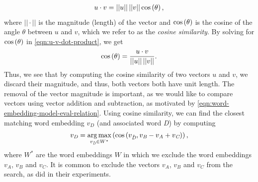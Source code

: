 \begin{align}
    u \cdot v = ||u||\,||v|| \cos\left(\theta\right),
    \label{eqn:u-v-dot-product}
\end{align}
where $||\cdot||$ is the magnitude (length) of the vector and $\cos \left(\theta\right)$ is the cosine of the angle $\theta$ between $u$ and $v$, which we refer to as the \textit{cosine similarity}. By solving for $\cos \left(\theta\right)$ in \cref{eqn:u-v-dot-product}, we get
\begin{align}
    \cos\left(\theta\right) = \frac{u \cdot v}{||u||\,||v||}.
    \label{eqn:cosine-similarity}
\end{align}
Thus, we see that by computing the cosine similarity of two vectors $u$ and $v$, we discard their magnitude, and thus, both vectors both have unit length. The removal of the vector magnitude is important, as we would like to compare vectors using vector addition and subtraction, as motivated by \cref{eqn:word-embedding-model-eval-relation}. Using cosine similarity, we can find the closest matching word embedding $v_{\textit{D}}$ (and associated word \textit{D}) by computing
\begin{align}
    v_{\textit{D}} = \operatorname*{arg\,max}_{v_{\Tilde{\textit{D}}} \in W^*} \left(\cos \left(v_{\Tilde{\textit{D}}}, v_{\textit{B}} - v_{\textit{A}} + v_{\textit{C}}\right)\right),
\end{align}
where $W^*$ are the word embeddings $W$ in which we exclude the word embeddings $v_{\textit{A}}$, $v_{\textit{B}}$ and $v_{\textit{C}}$. It is common to exclude the vectors $v_{\textit{A}}$, $v_{\textit{B}}$ and $v_{\textit{C}}$ from the search, as \cite{mikolov2013a} did in their experiments.

